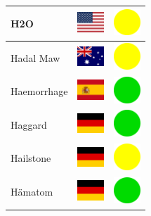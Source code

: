 \documentclass[12pt, a4paper, twoside]{report}
\begin{document}
\begin{center}
\begin{longtable}{|p{5cm}|p{2cm}|p{2cm}|}
 H2O                                                        & \includegraphics[width=1cm]{../img/flags/us} &   \includegraphics[width=1cm]{../likes/m} \\ \hline
 Hadal Maw                                                  & \includegraphics[width=1cm]{../img/flags/au} &   \includegraphics[width=1cm]{../likes/m} \\ \hline
 Haemorrhage                                                & \includegraphics[width=1cm]{../img/flags/es} &   \includegraphics[width=1cm]{../likes/y} \\ \hline
 Haggard                                                    & \includegraphics[width=1cm]{../img/flags/de} &   \includegraphics[width=1cm]{../likes/y} \\ \hline
 Hailstone                                                  & \includegraphics[width=1cm]{../img/flags/de} &   \includegraphics[width=1cm]{../likes/m} \\ \hline
 Hämatom                                                    & \includegraphics[width=1cm]{../img/flags/de} &   \includegraphics[width=1cm]{../likes/y} \\ \hline

\end{longtable}
\end{center}
\end{document}
